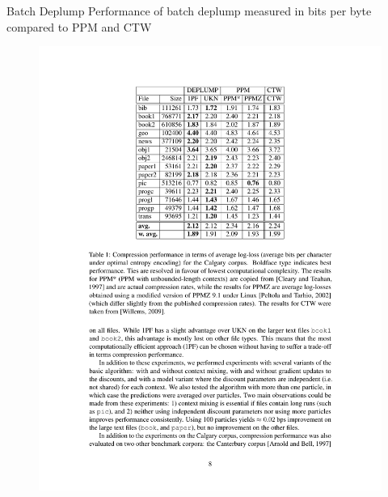 \documentclass{beamer}
\begin{document}
\begin{frame}[t]{Batch Deplump \cite{Gasthaus2010}}
Performance of batch deplump measured in bits per byte compared to PPM \cite{Cleary1997} and CTW \cite{Willems2009}
	\begin{figure}[t]
		\begin{center}
			\includegraphics[scale = .65]{../figs/batch_deplump_results.pdf}
		\end{center}
	\end{figure}
\end{frame}
\end{document}
